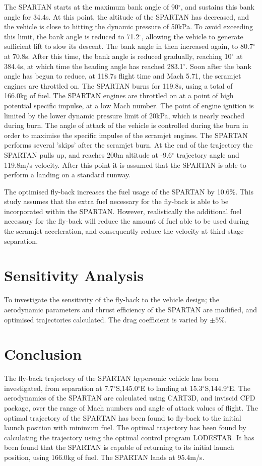 \documentclass[conf]{new-aiaa}
\begin{document}
The SPARTAN starts at the maximum bank angle of 90$^\circ$, and sustains this bank angle for 34.4s. At this point, the altitude of the SPARTAN has decreased, and the vehicle is close to hitting the dynamic pressure of 50kPa. To avoid exceeding this limit, the bank angle is reduced to 71.2$^\circ$, allowing the vehicle to generate sufficient lift to slow its descent. The bank angle in then increased again, to 80.7$^\circ$ at 70.8s. After this time, the bank angle is reduced gradually, reaching 10$^\circ$ at 384.4s, at which time the heading angle has reached 283.1$^\circ$. Soon after the bank angle has begun to reduce, at 118.7s flight time and Mach 5.71, the scramjet engines are throttled on. The SPARTAN burns for 119.8s, using a total of 166.0kg of fuel. The SPARTAN engines are throttled on at a point of high potential specific impulse, at a low Mach number. The point of engine ignition is limited by the lower dynamic pressure limit of 20kPa, which is nearly reached during burn. The angle of attack of the vehicle is controlled during the burn in order to maximise the specific impulse of the scramjet engines. The SPARTAN performs several 'skips' after the scramjet burn.
 At the end of the trajectory the SPARTAN pulls up, and reaches 200m altitude at -9.6$^\circ$ trajectory angle and 119.8m/s velocity. After this point it is assumed that the SPARTAN is able to perform a landing on a standard runway. 

The optimised fly-back increases the fuel usage of the SPARTAN by 10.6\%. This study assumes that the extra fuel necessary for the fly-back is able to be incorporated within the SPARTAN. However, realistically the additional fuel necessary for the fly-back will reduce the amount of fuel able to be used during the scramjet acceleration, and consequently reduce the velocity at third stage separation.

\section{Sensitivity Analysis}
To investigate the sensitivity of the fly-back to the vehicle design; the aerodynamic parameters and thrust efficiency of the SPARTAN are modified, and optimised trajectories calculated. The drag coefficient is varied by $\pm 5\%$. 

\section{Conclusion}
The fly-back trajectory of the SPARTAN hypersonic vehicle has been investigated, from separation at 7.7$^\circ$S,145.0$^\circ$E to landing at 15.3$^\circ$S,144.9$^\circ$E. The aerodynamics of the SPARTAN are calculated using CART3D, and inviscid CFD package, over the range of Mach numbers and angle of attack values of flight. The optimal trajectory of the SPARTAN has been found to fly-back to the initial launch position with minimum fuel. The optimal trajectory has been found by calculating the trajectory using the optimal control program LODESTAR. It has been found that the SPARTAN is capable of returning to its initial launch position, using 166.0kg of fuel. The SPARTAN lands at 95.4m/s.  
\end{document}
